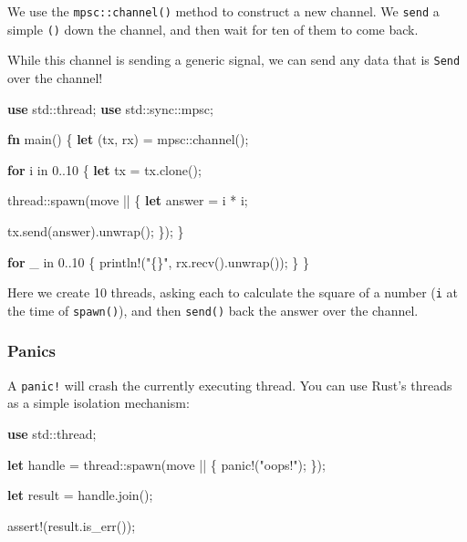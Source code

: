 \documentclass[a4paper,]{book}
\newenvironment{Shaded}{\begin{snugshade}}{\end{snugshade}}
\newcommand{\KeywordTok}[1]{\textcolor[rgb]{0.13,0.29,0.53}{\textbf{{#1}}}}
\newcommand{\DecValTok}[1]{\textcolor[rgb]{0.00,0.00,0.81}{{#1}}}
\newcommand{\StringTok}[1]{\textcolor[rgb]{0.31,0.60,0.02}{{#1}}}
\newcommand{\OtherTok}[1]{\textcolor[rgb]{0.56,0.35,0.01}{{#1}}}
\newcommand{\NormalTok}[1]{{#1}}
\begin{document}
We use the \texttt{mpsc::channel()} method to construct a new channel.
We \texttt{send} a simple \texttt{()} down the channel, and then wait
for ten of them to come back.

While this channel is sending a generic signal, we can send any data
that is \texttt{Send} over the channel!

\begin{Shaded}
\begin{Highlighting}[]
\KeywordTok{use} \NormalTok{std::thread;}
\KeywordTok{use} \NormalTok{std::sync::mpsc;}

\KeywordTok{fn} \NormalTok{main() \{}
    \KeywordTok{let} \NormalTok{(tx, rx) = mpsc::channel();}

    \KeywordTok{for} \NormalTok{i in }\DecValTok{0.}\NormalTok{.}\DecValTok{10} \NormalTok{\{}
        \KeywordTok{let} \NormalTok{tx = tx.clone();}

        \NormalTok{thread::spawn(move || \{}
            \KeywordTok{let} \NormalTok{answer = i * i;}

            \NormalTok{tx.send(answer).unwrap();}
        \NormalTok{\});}
    \NormalTok{\}}

    \KeywordTok{for} \NormalTok{_ in }\DecValTok{0.}\NormalTok{.}\DecValTok{10} \NormalTok{\{}
        \OtherTok{println!}\NormalTok{(}\StringTok{"\{\}"}\NormalTok{, rx.recv().unwrap());}
    \NormalTok{\}}
\NormalTok{\}}
\end{Highlighting}
\end{Shaded}

Here we create 10 threads, asking each to calculate the square of a
number (\texttt{i} at the time of \texttt{spawn()}), and then
\texttt{send()} back the answer over the channel.

\subsubsection{Panics}\label{panics}

A \texttt{panic!} will crash the currently executing thread. You can use
Rust's threads as a simple isolation mechanism:

\begin{Shaded}
\begin{Highlighting}[]
\KeywordTok{use} \NormalTok{std::thread;}

\KeywordTok{let} \NormalTok{handle = thread::spawn(move || \{}
    \OtherTok{panic!}\NormalTok{(}\StringTok{"oops!"}\NormalTok{);}
\NormalTok{\});}

\KeywordTok{let} \NormalTok{result = handle.join();}

\OtherTok{assert!}\NormalTok{(result.is_err());}
\end{Highlighting}
\end{Shaded}
\end{document}
